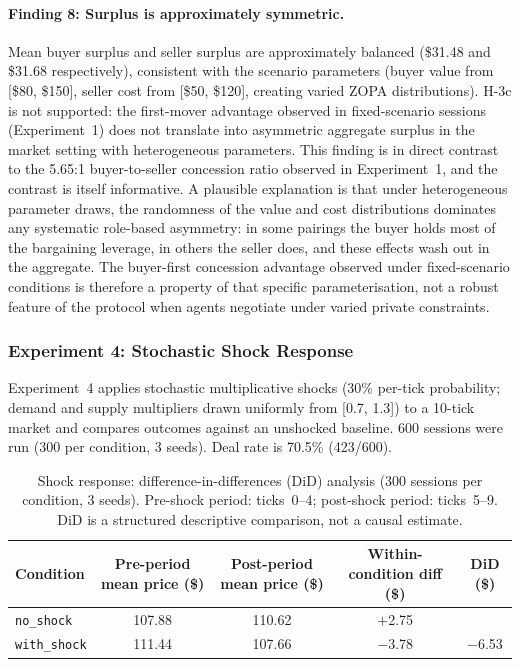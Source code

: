 \paragraph{Finding 8: Surplus is approximately symmetric.}
Mean buyer surplus and seller surplus are approximately balanced (\$31.48 and \$31.68 respectively), consistent with the scenario parameters (buyer value from [\$80, \$150], seller cost from [\$50, \$120], creating varied ZOPA distributions).  H-3c is not supported: the first-mover advantage observed in fixed-scenario sessions (Experiment~1) does not translate into asymmetric aggregate surplus in the market setting with heterogeneous parameters.  This finding is in direct contrast to the 5.65:1 buyer-to-seller concession ratio observed in Experiment~1, and the contrast is itself informative.  A plausible explanation is that under heterogeneous parameter draws, the randomness of the value and cost distributions dominates any systematic role-based asymmetry: in some pairings the buyer holds most of the bargaining leverage, in others the seller does, and these effects wash out in the aggregate.  The buyer-first concession advantage observed under fixed-scenario conditions is therefore a property of that specific parameterisation, not a robust feature of the protocol when agents negotiate under varied private constraints.

\subsubsection{Experiment 4: Stochastic Shock Response}
\label{sec:results-shock}

Experiment~4 applies stochastic multiplicative shocks (30\% per-tick probability; demand and supply multipliers drawn uniformly from [0.7, 1.3]) to a 10-tick market and compares outcomes against an unshocked baseline.  600 sessions were run (300 per condition, 3 seeds).  Deal rate is 70.5\% (423/600).

\begin{table}[ht]
\centering
\caption{Shock response: difference-in-differences (DiD) analysis (300 sessions per condition, 3 seeds).  Pre-shock period: ticks~0--4; post-shock period: ticks~5--9.  DiD is a structured descriptive comparison, not a causal estimate.}
\label{tab:shock}
\begin{tabular}{@{}lcccc@{}}
\toprule
Condition & Pre-period mean price (\$) & Post-period mean price (\$) & Within-condition diff (\$) & DiD (\$) \\
\midrule
\texttt{no\_shock}   & 107.88 & 110.62 & $+$2.75 & \\
\texttt{with\_shock} & 111.44 & 107.66 & $-$3.78 & $-$6.53 \\
\bottomrule
\end{tabular}
\end{table}

